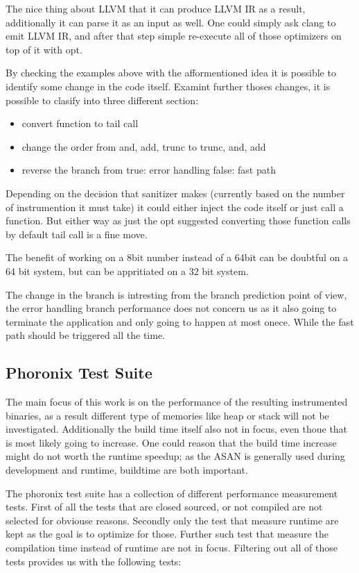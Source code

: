 \documentclass[letterpaper, 10 pt]{llncs}
\let\cite\parencite
\begin{document}
The nice thing about LLVM that it can produce LLVM IR as a result, additionally it can parse it as an input as well. One could simply ask clang to emit LLVM IR, and after that step simple re-execute all of those optimizers on top of it with opt.

By checking the examples above with the afformentioned idea it is possible to identify some change in the code itself. Examint further thoses changes, it is possible to clasify into three different section:
\begin{itemize}
 \item convert function to tail call
 \item change the order from and, add, trunc to trunc, and, add
 \item reverse the branch from true: error handling false: fast path
\end{itemize}

Depending on the decision that sanitizer makes (currently based on the number of instrumention it must take) it could either inject the code itself or just call a function. But either way as just the opt suggested converting those function calls by default tail call is a fine move.

The benefit of working on a 8bit number instead of a 64bit can be doubtful on a 64 bit system, but can be appritiated on a 32 bit system.

The change in the branch is intresting from the branch prediction point of view, the error handling branch performance does not concern us as it also going to terminate the application and only going to happen at most onece. While the fast path should be triggered all the time.

\subsection{Phoronix Test Suite}

The main focus of this work is on the performance of the resulting instrumented binaries, as a result different type of memories like heap or stack will not be investigated. Additionally the build time itself also not in focus, even thoue that is most likely going to increase. One could reason that the build time increase might do not worth the runtime speedup; as the ASAN is generally used during development and runtime, buildtime are both important.

The phoronix test suite\cite{larabel2011phoronix} has a collection of different performance measurement tests. First of all the tests that are closed sourced, or not compiled are not selected for obviouse reasons. Secondly only the test that measure runtime are kept as the goal is to optimize for those.  Further such test that measure the compilation time instead of runtime are not in focus. Filtering out all of those tests provides us with the following tests:
\end{document}
